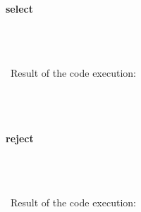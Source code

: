 \documentclass{article}
\begin{document}
\begin{verbatim} 

\end{verbatim}

\paragraph{}\





\paragraph{ select}\

\begin{verbatim}

\end{verbatim}


\paragraph{}\
Result of the code execution:

\begin{verbatim} 

\end{verbatim}

\paragraph{}\





\paragraph{ reject}\

\begin{verbatim}

\end{verbatim}


\paragraph{}\
Result of the code execution:

\begin{verbatim} 

\end{verbatim}
\end{document}
